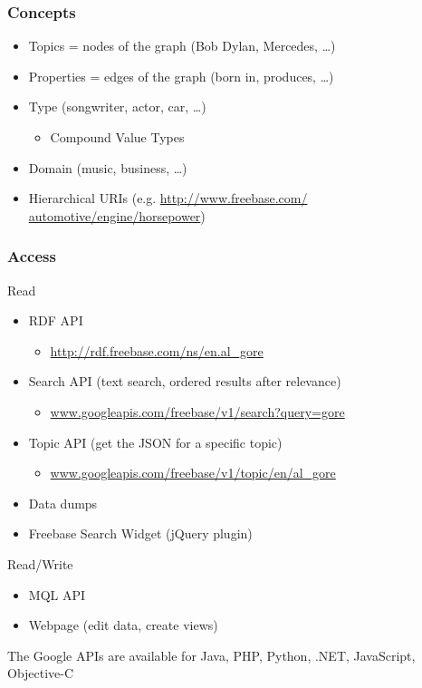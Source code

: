 \begin{frame}
\frametitle{Concepts}
\begin{itemize}
  \item Topics = nodes of the graph (Bob Dylan, Mercedes, \ldots)
  \item Properties = edges of the graph (born in, produces, \ldots)
  \item Type (songwriter, actor, car, \ldots)
  \begin{itemize}
    \item Compound Value Types
   \end{itemize}
  \item Domain (music, business, \ldots)
  \item Hierarchical URIs (e.g.
  \url{http://www.freebase.com/} \\ \url{automotive/engine/horsepower})
\end{itemize}
\end{frame}

\begin{frame}
\frametitle{Access}
 Read
  \begin{itemize}
  \item RDF API
  \begin{itemize}
    \item  \url{http://rdf.freebase.com/ns/en.al_gore}
  \end{itemize}
  \item Search API (text search, ordered results after relevance)
  \begin{itemize}
    \item  \url{www.googleapis.com/freebase/v1/search?query=gore}
  \end{itemize}
  \item Topic API (get the JSON for a specific topic)
  \begin{itemize}
    \item  \url{www.googleapis.com/freebase/v1/topic/en/al_gore}
  \end{itemize}
  \item Data dumps
  \item Freebase Search Widget (jQuery plugin)
  \end{itemize}
  Read/Write
  \begin{itemize}
  \item MQL API
  \item Webpage (edit data, create views)
  \end{itemize}
  The Google APIs are available for Java, PHP, Python, .NET, JavaScript,
  Objective-C
\end{frame}

